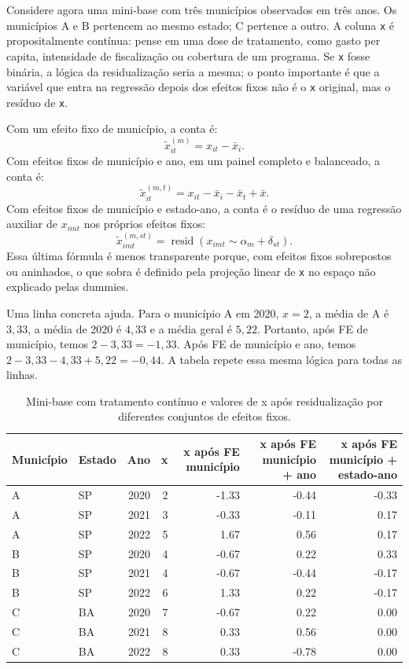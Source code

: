 \documentclass[
]{article}
\begin{document}
Considere agora uma mini-base com três municípios observados em três anos. Os municípios A e B pertencem ao mesmo estado; C pertence a outro. A coluna \texttt{x} é propositalmente contínua: pense em uma dose de tratamento, como gasto per capita, intensidade de fiscalização ou cobertura de um programa. Se \texttt{x} fosse binária, a lógica da residualização seria a mesma; o ponto importante é que a variável que entra na regressão depois dos efeitos fixos não é o \texttt{x} original, mas o resíduo de \texttt{x}.

Com um efeito fixo de município, a conta é:
\[
\tilde{x}_{it}^{(m)} = x_{it} - \bar{x}_i.
\]
Com efeitos fixos de município e ano, em um painel completo e balanceado, a conta é:
\[
\tilde{x}_{it}^{(m,t)} = x_{it} - \bar{x}_i - \bar{x}_t + \bar{x}.
\]
Com efeitos fixos de município e estado-ano, a conta é o resíduo de uma regressão auxiliar de \(x_{imt}\) nos próprios efeitos fixos:
\[
\tilde{x}_{imt}^{(m,st)} =
\operatorname{resid}\left(x_{imt} \sim \alpha_m + \delta_{st}\right).
\]
Essa última fórmula é menos transparente porque, com efeitos fixos sobrepostos ou aninhados, o que sobra é definido pela projeção linear de \texttt{x} no espaço não explicado pelas dummies.

Uma linha concreta ajuda. Para o município A em 2020, \(x = 2\), a média de A é \(3{,}33\), a média de 2020 é \(4{,}33\) e a média geral é \(5{,}22\). Portanto, após FE de município, temos \(2 - 3{,}33 = -1{,}33\). Após FE de município e ano, temos \(2 - 3{,}33 - 4{,}33 + 5{,}22 = -0{,}44\). A tabela repete essa mesma lógica para todas as linhas.

\begin{table}

\caption{\label{tab:toy-panel-residualization}Mini-base com tratamento contínuo e valores de x após residualização por diferentes conjuntos de efeitos fixos.}
\centering
\begin{tabular}[t]{l|l|r|r|r|r|r}
\hline
Município & Estado & Ano & x & x após FE município & x após FE município + ano & x após FE município + estado-ano\\
\hline
A & SP & 2020 & 2 & -1.33 & -0.44 & -0.33\\
\hline
A & SP & 2021 & 3 & -0.33 & -0.11 & 0.17\\
\hline
A & SP & 2022 & 5 & 1.67 & 0.56 & 0.17\\
\hline
B & SP & 2020 & 4 & -0.67 & 0.22 & 0.33\\
\hline
B & SP & 2021 & 4 & -0.67 & -0.44 & -0.17\\
\hline
B & SP & 2022 & 6 & 1.33 & 0.22 & -0.17\\
\hline
C & BA & 2020 & 7 & -0.67 & 0.22 & 0.00\\
\hline
C & BA & 2021 & 8 & 0.33 & 0.56 & 0.00\\
\hline
C & BA & 2022 & 8 & 0.33 & -0.78 & 0.00\\
\hline
\end{tabular}
\end{table}
\end{document}
